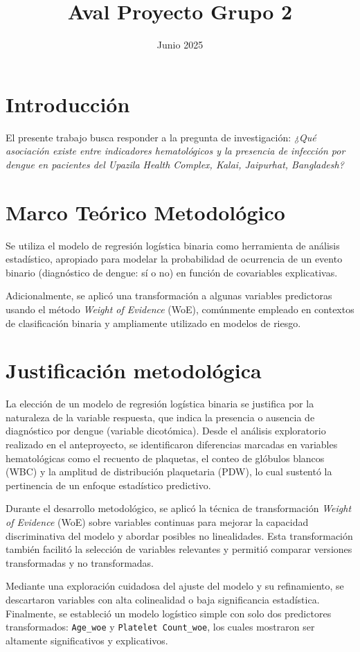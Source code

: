 \documentclass[12pt,letterpaper]{article}
\title{Aval Proyecto Grupo 2}
\date{Junio 2025}
\begin{document}
	
	\maketitle
	
\section*{Introducción}
El presente trabajo busca responder a la pregunta de investigación: \emph{¿Qué asociación existe entre indicadores hematológicos y la presencia de infección por dengue en pacientes del Upazila Health Complex, Kalai, Jaipurhat, Bangladesh?}

\section*{Marco Teórico Metodológico}
Se utiliza el modelo de regresión logística binaria como herramienta de análisis estadístico, apropiado para modelar la probabilidad de ocurrencia de un evento binario (diagnóstico de dengue: sí o no) en función de covariables explicativas.

Adicionalmente, se aplicó una transformación a algunas variables predictoras usando el método \textit{Weight of Evidence} (WoE), comúnmente empleado en contextos de clasificación binaria y ampliamente utilizado en modelos de riesgo.

\section*{Justificación metodológica}
La elección de un modelo de regresión logística binaria se justifica por la naturaleza de la variable respuesta, que indica la presencia o ausencia de diagnóstico por dengue (variable dicotómica). Desde el análisis exploratorio realizado en el anteproyecto, se identificaron diferencias marcadas en variables hematológicas como el recuento de plaquetas, el conteo de glóbulos blancos (WBC) y la amplitud de distribución plaquetaria (PDW), lo cual sustentó la pertinencia de un enfoque estadístico predictivo.

Durante el desarrollo metodológico, se aplicó la técnica de transformación \textit{Weight of Evidence} (WoE) sobre variables continuas para mejorar la capacidad discriminativa del modelo y abordar posibles no linealidades. Esta transformación también facilitó la selección de variables relevantes y permitió comparar versiones transformadas y no transformadas.

Mediante una exploración cuidadosa del ajuste del modelo y su refinamiento, se descartaron variables con alta colinealidad o baja significancia estadística. Finalmente, se estableció un modelo logístico simple con solo dos predictores transformados: \texttt{Age\_woe} y \texttt{Platelet Count\_woe}, los cuales mostraron ser altamente significativos y explicativos.
\end{document}
